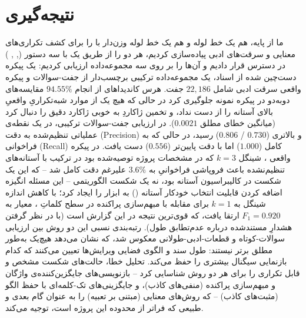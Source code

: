 \documentclass[11pt,a4paper]{article}
\begin{document}
	\section{نتیجه‌گیری}
	
	ما از پایه، هم یک خط لوله  و هم یک خط لوله  وزن‌دار با  را برای کشف تکراری‌های معنایی و سرقت‌های ادبی پیاده‌سازی کردیم، هر دو را از طریق یک  با سه دستور (, , ) در دسترس قرار دادیم و آن‌ها را بر روی سه مجموعه‌داده ارزیابی کردیم: یک پیکره دست‌چین شده از اسناد، یک مجموعه‌داده ترکیبی برچسب‌دار از جفت-سوالات و پیکره واقعی سرقت ادبی  شامل $22{,}186$ جفت. هرس کاندیداهای  از انجام $94.55\%$ مقایسه‌های دوبه‌دو در پیکره نمونه جلوگیری کرد در حالی که هیچ یک از موارد شبه‌تکراریِ واقعیِ بالای آستانه را از دست نداد، و تخمین ژاکاردِ  به خوبی ژاکارد دقیق را دنبال کرد (میانگین خطای مطلق $0.0021$). در ارزیابی جفت-سوالات ترکیبی،  در یک نقطه‌ی عملیاتی تنظیم‌شده به دقت (Precision) و  بالاتری ($0.730$ / $0.806$) رسید، در حالی که  به فراخوانی (Recall) کامل ($1.000$) اما با دقت پایین‌تر ($0.556$) دست یافت. در پیکره واقعی ، شینگل $k=3$ که در مشخصات پروژه توصیه‌شده بود در ترکیب با آستانه‌های تنظیم‌نشده باعث فروپاشی فراخوانیِ  به $3.6\%$ علیرغم دقت کامل شد -- که این یک شکست در کالیبراسیون آستانه بود، نه یک شکست الگوریتمی -- این مسئله انگیزه اضافه کردن قابلیت انتخاب خودکار آستانه () به ابزار را ایجاد کرد؛ با کاهش اندازه شینگل به $k=1$ برای مقابله با مبهم‌سازی پراکنده در سطح کلماتِ ، معیار  به $F_1=0.920$ ارتقا یافت، که قوی‌ترین نتیجه در این گزارش است (با در نظر گرفتن هشدارِ مستندشده درباره عدم‌تطابق طول). رتبه‌بندی نسبی این دو روش بین ارزیابی سوالات-کوتاه و قطعات-ادبی-طولانی معکوس شد، که نشان می‌دهد هیچ‌یک به‌طور مطلق برتر نیستند: طول سند و الگوی فضایی ویرایش‌ها تعیین می‌کنند که کدام بازنمایی سیگنال بیشتری را حفظ می‌کند. تحلیل خطا، حالت‌های شکست مشخص و قابل تکراری را برای هر دو روش شناسایی کرد -- بازنویسی‌های جایگزین‌کننده‌ی واژگان و مبهم‌سازی پراکنده (منفی‌های کاذب)، و جایگزینی‌های تک-کلمه‌ای با حفظ الگو (مثبت‌های کاذب) -- که روش‌های معنایی (مبتنی بر تعبیه) را به عنوان گام بعدی و طبیعی که فراتر از محدوده این پروژه است، توجیه می‌کند.
	
\end{document}

